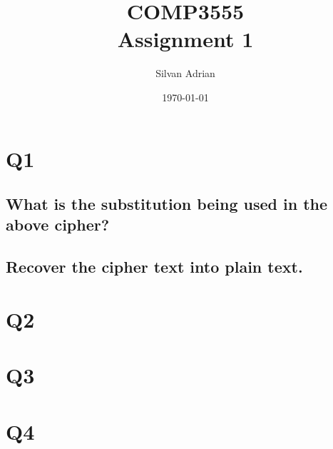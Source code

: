 \documentclass{article}
\title{COMP3555 \\Assignment 1}
\author{Silvan Adrian}
\date{\today}
\begin{document}
\maketitle

\section{Q1}

\subsection{What is the substitution being used in the above cipher?}

\subsection{Recover the cipher text into plain text.}


\section{Q2}

\section{Q3}

\section{Q4}
\end{document}
